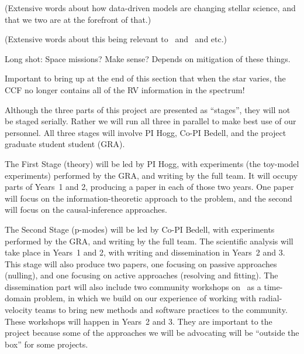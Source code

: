 \documentclass[12pt, letterpaper]{article}
\begin{document}
(Extensive words about how data-driven models are changing stellar science, and
that we two are at the forefront of that.)

(Extensive words about this being relevant to \NASA\ and \XRP\ and etc.)

Long shot: Space missions? Make sense? Depends on mitigation of these things.


Important to bring up at the end of this section that when the star
varies, the CCF no longer contains all of the RV information in the
spectrum!




Although the three parts of this project are presented as ``stages'',
they will not be staged serially.
Rather we will run all three in parallel to make best use of our
personnel.
All three stages will involve PI Hogg, Co-PI Bedell, and the project
graduate student student (GRA). 

The First Stage (theory) will be led by PI Hogg, with experiments (the
toy-model experiments) performed by the GRA, and writing by the full
team.
It will occupy parts of Years~1 and 2, producing a paper
in each of those two years.
One paper will focus on the information-theoretic approach to the problem,
and the second will focus on the causal-inference approaches.

The Second Stage (p-modes) will be led by Co-PI Bedell, with
experiments performed by the GRA, and writing by the full team.
The scientific analysis will take place in Years~1 and 2, with
writing and dissemination in Years~2 and 3.
This stage will also produce two papers, one focusing on passive
approaches (nulling), and one focusing on active approaches (resolving
and fitting).
The dissemination part will also include two community workshops on
\EPRV\ as a time-domain problem, in which we build on our experience
of working with radial-velocity teams to bring new methods and
software practices to the community.
These workshops will happen in Years~2 and 3.
They are important to the project because some of the approaches we
will be advocating will be ``outside the box'' for some projects.
\end{document}
